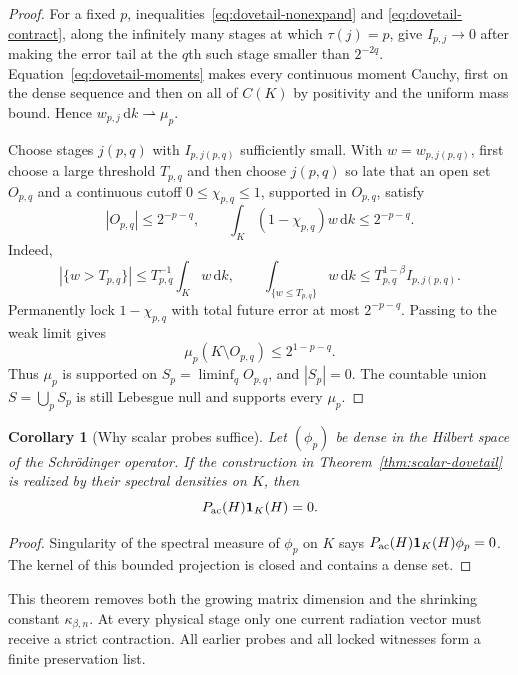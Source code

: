 \documentclass[11pt]{article}
\newtheorem{corollary}[theorem]{Corollary}
\theoremstyle{remark}
\newcommand{\dd}{\,\mathrm d}
\begin{document}
\begin{proof}
For a fixed $p$, inequalities~\eqref{eq:dovetail-nonexpand} and
\eqref{eq:dovetail-contract}, along the infinitely many stages at which
$\tau(j)=p$, give $I_{p,j}\to0$ after making the error tail at the $q$th such
stage smaller than $2^{-2q}$.  Equation~\eqref{eq:dovetail-moments} makes
every continuous moment Cauchy, first on the dense sequence and then on all
of $C(K)$ by positivity and the uniform mass bound.  Hence
$w_{p,j}\dd k\rightharpoonup\mu_p$.

Choose stages $j(p,q)$ with $I_{p,j(p,q)}$ sufficiently small.  With
$w=w_{p,j(p,q)}$, first choose a large threshold $T_{p,q}$ and then choose
$j(p,q)$ so late that an open set $O_{p,q}$ and a continuous cutoff
$0\leq\chi_{p,q}\leq1$, supported in $O_{p,q}$, satisfy
\begin{equation}
 |O_{p,q}|\leq2^{-p-q},\qquad
 \int_K(1-\chi_{p,q})w\dd k\leq2^{-p-q}.
 \label{eq:dovetail-witness}
\end{equation}
Indeed,
\[
 |\{w>T_{p,q}\}|\leq T_{p,q}^{-1}\int_Kw\dd k,
 \qquad
 \int_{\{w\leq T_{p,q}\}}w\dd k
 \leq T_{p,q}^{1-\beta}I_{p,j(p,q)}.
\]
Permanently lock $1-\chi_{p,q}$ with total future error at most
$2^{-p-q}$.  Passing to the weak limit gives
\[
 \mu_p(K\setminus O_{p,q})\leq2^{1-p-q}.
\]
Thus $\mu_p$ is supported on
$S_p=\liminf_qO_{p,q}$, and $|S_p|=0$.  The countable union
$S=\bigcup_pS_p$ is still Lebesgue null and supports every $\mu_p$.
\end{proof}

\begin{corollary}[Why scalar probes suffice]
\label{cor:dense-probes}
Let $(\phi_p)$ be dense in the Hilbert space of the Schr\"odinger operator.
If the construction in Theorem~\ref{thm:scalar-dovetail} is realized by their
spectral densities on $K$, then
\[
 P_{\rm ac}(H)\mathbf1_K(H)=0.
\]
\end{corollary}

\begin{proof}
Singularity of the spectral measure of $\phi_p$ on $K$ says
$P_{\rm ac}(H)\mathbf1_K(H)\phi_p=0$.  The kernel of this bounded projection
is closed and contains a dense set.
\end{proof}

This theorem removes both the growing matrix dimension and the shrinking
constant $\kappa_{\beta,n}$.  At every physical stage only one current
radiation vector must receive a strict contraction.  All earlier probes and
all locked witnesses form a finite preservation list.
\end{document}
